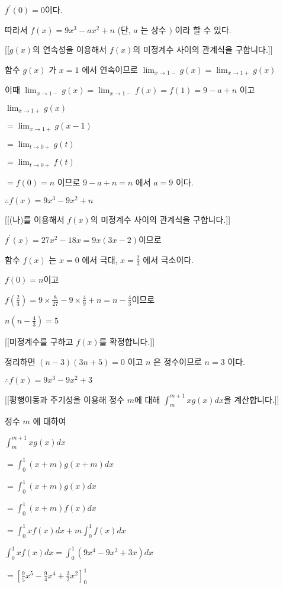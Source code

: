 \documentclass{oblivoir}
\begin{document}
$f^{\prime}(0)=0$이다.

따라서 $f(x)=9 x^{3}-a x^{2}+n$ (단, $a$ 는 상수 $)$ 이라 할 수 있다.

[[$g(x)$의 연속성을 이용해서 $f(x)$의 미정계수 사이의 관계식을 구합니다.]]

함수 $g(x)$ 가 $x=1$ 에서 연속이므로 $\lim _{x \rightarrow 1-} g(x)=\lim _{x \rightarrow 1+} g(x)$

이때 $\lim _{x \rightarrow 1-} g(x)=\lim _{x \rightarrow 1-} f(x)=f(1)=9-a+n$ 이고

$\lim _{x \rightarrow 1+} g(x) $

$=\lim _{x \rightarrow 1+} g(x-1)$

$=\lim _{t \rightarrow 0+} g(t)$

$=\lim _{t \rightarrow 0+} f(t)$

$=f(0)=n$ 이므로 $9-a+n=n$ 에서 $a=9$ 이다.

$\therefore f(x)=9 x^{3}-9 x^{2}+n$

[[(나)를 이용해서 $f(x)$의 미정계수 사이의 관계식을 구합니다.]]

$f^{\prime}(x)=27 x^{2}-18 x=9 x(3 x-2)$이므로

함수 $f(x)$ 는 $x=0$ 에서 극대, $x=\frac{2}{3}$ 에서 극소이다.

$f(0)=n$이고

$f\left(\frac{2}{3}\right)=9 \times \frac{8}{27}-9 \times \frac{4}{9}+n=n-\frac{4}{3}$이므로

$n\left(n-\frac{4}{3}\right)=5$

[[미정계수를 구하고 $f(x)$를 확정합니다.]] 

정리하면 $(n-3)(3 n+5)=0$ 이고 $n$ 은 정수이므로 $n=3$ 이다.

$\therefore f(x)=9 x^{3}-9 x^{2}+3$

[[평행이동과 주기성을 이용해 정수 $m$에 대해 $\int_{m}^{m+1} x g(x) d x$을 계산합니다.]]

정수 $m$ 에 대하여

$\int_{m}^{m+1} x g(x) d x$

$=\int_{0}^{1}(x+m) g(x+m) d x$

$=\int_{0}^{1}(x+m) g(x) d x$

$=\int_{0}^{1}(x+m) f(x) d x$

$=\int_{0}^{1} x f(x) d x+m \int_{0}^{1} f(x) d x$

$\int_{0}^{1} x f(x) d x=\int_{0}^{1}\left(9 x^{4}-9 x^{3}+3 x\right) d x$

$=\left[\frac{9}{5} x^{5}-\frac{9}{4} x^{4}+\frac{3}{2} x^{2}\right]_{0}^{1}$
\end{document}
